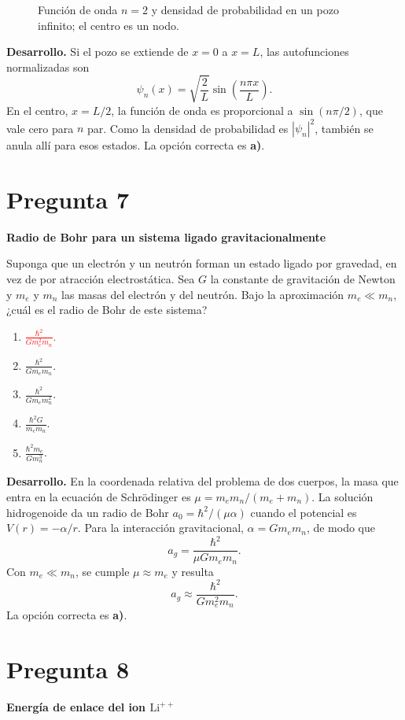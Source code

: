 \documentclass[a4paper,11pt]{article}
\newcommand{\pregunta}[2]{\section*{Pregunta #1}\textbf{#2}\par}
\begin{document}
\begin{figure}[H]
\centering

\caption{Función de onda $n=2$ y densidad de probabilidad en un pozo infinito; el centro es un nodo.}
\end{figure}

\textbf{Desarrollo.} Si el pozo se extiende de $x=0$ a $x=L$, las autofunciones normalizadas son
\[
\psi_n(x)=\sqrt{\frac{2}{L}}\sin\!\left(\frac{n\pi x}{L}\right).
\]
En el centro, $x=L/2$, la función de onda es proporcional a $\sin(n\pi/2)$, que vale cero para $n$ par. Como la densidad de probabilidad es $|\psi_n|^2$, también se anula allí para esos estados. La opción correcta es \textbf{a)}. \parencite[Sec. 19.2, ecs. (19.13)--(19.19), pp. 627--628]{chaparro2026}

\pregunta{7}{Radio de Bohr para un sistema ligado gravitacionalmente}

Suponga que un electrón y un neutrón forman un estado ligado por gravedad, en vez de por atracción electrostática. Sea $G$ la constante de gravitación de Newton y $m_e$ y $m_n$ las masas del electrón y del neutrón. Bajo la aproximación $m_e\ll m_n$, ¿cuál es el radio de Bohr de este sistema?

\begin{enumerate}
    \item \textcolor{red}{$\displaystyle\frac{\hbar^2}{Gm_e^2m_n}$.}
    \item $\displaystyle\frac{\hbar^2}{Gm_em_n}$.
    \item $\displaystyle\frac{\hbar^2}{Gm_em_n^2}$.
    \item $\displaystyle\frac{\hbar^2G}{m_em_n}$.
    \item $\displaystyle\frac{\hbar^2m_e}{Gm_n^3}$.
\end{enumerate}

\textbf{Desarrollo.} En la coordenada relativa del problema de dos cuerpos, la masa que entra en la ecuación de Schrödinger es $\mu=m_em_n/(m_e+m_n)$. La solución hidrogenoide da un radio de Bohr $a_0=\hbar^2/(\mu\alpha)$ cuando el potencial es $V(r)=-\alpha/r$. Para la interacción gravitacional, $\alpha=Gm_em_n$, de modo que
\[
a_g=\frac{\hbar^2}{\mu Gm_em_n}.
\]
Con $m_e\ll m_n$, se cumple $\mu\approx m_e$ y resulta
\[
a_g\approx\frac{\hbar^2}{Gm_e^2m_n}.
\]
La opción correcta es \textbf{a)}. \parencite[Sec. 20.2, pp. 661--662; Sec. 20.4, ec. (20.68), p. 675]{chaparro2026}

\pregunta{8}{Energía de enlace del ion $\mathrm{Li}^{++}$}
\end{document}
